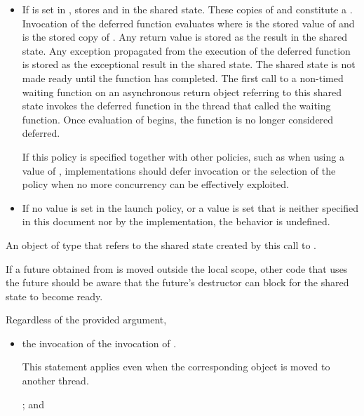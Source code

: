\begin{itemdescr}
\begin{itemize}
\item
If  is set in ,
stores  and
in the shared state. These copies of  and  constitute
a . Invocation of the deferred function evaluates
 where  is the stored value of
 and  is the stored copy of
.
Any return value is stored
as the result in the shared state.
Any exception propagated
from the execution
of the deferred function
is stored as the exceptional result
in the shared state.
The shared state is not
made ready until the function has completed. The first call to a
non-timed waiting function
on an asynchronous return object referring to
this shared state invokes the
deferred function in the thread that called the waiting function.
Once evaluation of  begins, the function is no longer
considered deferred.
\begin{note}
If this policy is specified together with other policies, such as when using a
 value of , implementations should defer
invocation or the selection of the policy when no more concurrency can be effectively
exploited.
\end{note}

\item
If no value is set in the launch policy, or a value is set that is neither specified
in this document nor by the implementation, the behavior is undefined.
\end{itemize}

\pnum
\returns
An object of type
 that refers
to the shared state created by this call to .
\begin{note}
If a future obtained from  is moved outside the local scope,
other code that uses the future should be aware that the future's destructor can
block for the shared state to become ready.
\end{note}

\pnum
\sync
Regardless of the provided  argument,
\begin{itemize}
\item
the invocation of 
 the invocation of .
\begin{note}
This statement applies even when the corresponding  object is moved to
another thread.
\end{note}
; and


\end{itemize}
\end{itemdescr}
